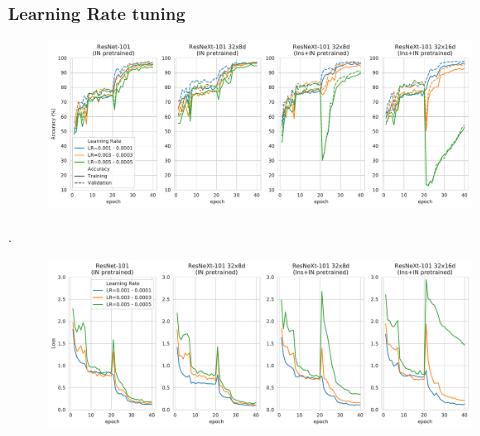 \documentclass{beamer}
\begin{document}
\begin{frame}
	\frametitle{Learning Rate tuning}
	

\begin{figure}[h]
	\begin{center}
		\includegraphics[width=0.75\linewidth]{lr_4models.pdf}
	\end{center}
	\label{fig:lr}
\end{figure}
.

\begin{figure}[h]
	\begin{center}
		\includegraphics[width=0.75\linewidth]{loss_4models.pdf}
	\end{center}
\end{figure}

	
\end{frame}
\end{document}
